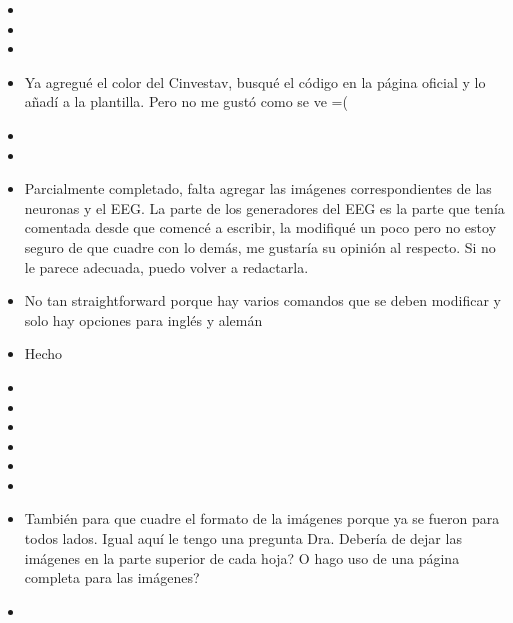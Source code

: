 %



\begin{itemize}
	\item {}
	\item {}
	\item {}
	\item {} Ya agregué el color del Cinvestav, busqué el código en la página oficial y lo añadí a la plantilla. Pero no me gustó como se ve =(
	\item {}
	\item {}
	\item {} Parcialmente completado, falta agregar las imágenes correspondientes de las neuronas y el EEG. La parte de los generadores del EEG es la parte que tenía comentada desde que comencé a escribir, la modifiqué un poco pero no estoy seguro de que cuadre con lo demás, me gustaría su opinión al respecto. Si no le parece adecuada, puedo volver a redactarla.
	\item {} No tan straightforward porque hay varios comandos que se deben modificar y solo hay opciones para inglés y alemán
	\item {} Hecho
	\item {}
	\item {}
	\item {}
	\item {}
	\item {}
	\item {}
	\item {} También para que cuadre el formato de la imágenes porque ya se fueron para todos lados. Igual aquí le tengo una pregunta Dra. Debería de dejar las imágenes en la parte superior de cada hoja? O hago uso de una página completa para las imágenes?
	\item {}
\end{itemize}
